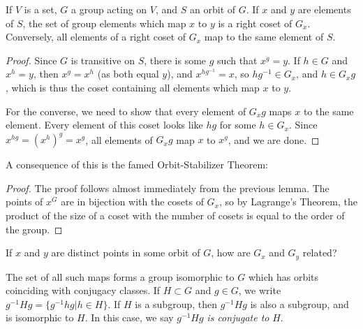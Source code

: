 \begin{lemma}
{If $V$ is a set, $G$ a group acting on $V$, and $S$ an orbit of $G$.  If $x$ and $y$ are elements of $S$, the set of group elements which map $x$ to $y$ is a right coset of $G_x$.  Conversely, all elements of a right coset of $G_x$ map to the same element of $S$.}
\end{lemma}
\begin{proof}
	
	
	Since $G$ is transitive on $S$, there is some $g$ such that $x^g=y$.  If $h\in G$ and $x^h=y$, then $x^g=x^h$ (as both equal $y$), and $x^{hg^{-1}} =x$, so $hg^{-1}\in G_x$, and $h\in G_xg$, which is thus the coset containing all elements which map $x$ to $y$.
	
	For the converse, we need to show that every element of $G_xg$ maps $x$ to the same element.  Every element of this coset looks like $hg$ for some $h\in G_x$.  Since $x^{hg}=(x^h)^g=x^g$, all elements of $G_xg$ map $x$ to $x^g$, and we are done.
	
	
	
	
\end{proof}

A consequence of this is the famed Orbit-Stabilizer Theorem:

\begin{proof}
	The proof follows almost immediately from the previous lemma.  The points of $x^G$ are in bijection with the cosets of $G_x$, so by Lagrange's Theorem, the product of the size of a coset with the number of cosets is equal to the order of the group.
\end{proof}


If $x$ and $y$ are distinct points in some orbit of $G$, how are $G_x$ and $G_y$ related?


The set of all such maps forms a group isomorphic to $G$ which has orbits coinciding with conjugacy classes.  If $H\subset G$ and $g\in G$, we write $g^{-1}Hg = \{g^{-1}hg|h\in H\}$.  If $H$ is a subgroup, then $g^{-1}Hg$ is also a subgroup, and is isomorphic to $H$.  In this case, we say $g^{-1}Hg$ \textit{is conjugate to} $H$.

